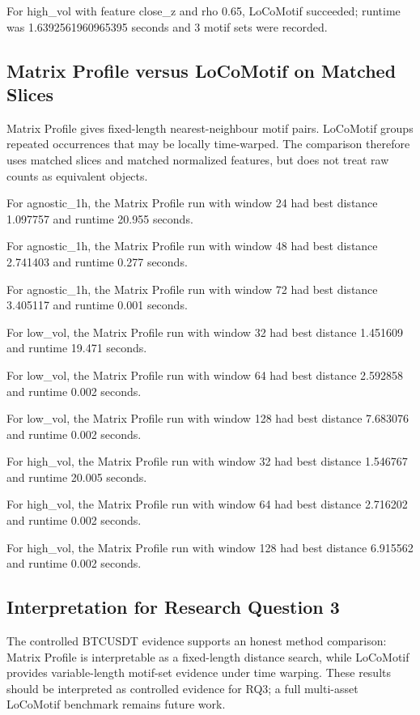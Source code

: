For high\_vol with feature close\_z and rho 0.65, LoCoMotif succeeded; runtime was 1.6392561960965395 seconds and 3 motif sets were recorded.

\subsection{Matrix Profile versus LoCoMotif on Matched Slices}

Matrix Profile gives fixed-length nearest-neighbour motif pairs. LoCoMotif groups repeated occurrences that may be locally time-warped. The comparison therefore uses matched slices and matched normalized features, but does not treat raw counts as equivalent objects.

For agnostic\_1h, the Matrix Profile run with window 24 had best distance 1.097757 and runtime 20.955 seconds.

For agnostic\_1h, the Matrix Profile run with window 48 had best distance 2.741403 and runtime 0.277 seconds.

For agnostic\_1h, the Matrix Profile run with window 72 had best distance 3.405117 and runtime 0.001 seconds.

For low\_vol, the Matrix Profile run with window 32 had best distance 1.451609 and runtime 19.471 seconds.

For low\_vol, the Matrix Profile run with window 64 had best distance 2.592858 and runtime 0.002 seconds.

For low\_vol, the Matrix Profile run with window 128 had best distance 7.683076 and runtime 0.002 seconds.

For high\_vol, the Matrix Profile run with window 32 had best distance 1.546767 and runtime 20.005 seconds.

For high\_vol, the Matrix Profile run with window 64 had best distance 2.716202 and runtime 0.002 seconds.

For high\_vol, the Matrix Profile run with window 128 had best distance 6.915562 and runtime 0.002 seconds.

\subsection{Interpretation for Research Question 3}

The controlled BTCUSDT evidence supports an honest method comparison: Matrix Profile is interpretable as a fixed-length distance search, while LoCoMotif provides variable-length motif-set evidence under time warping. These results should be interpreted as controlled evidence for RQ3; a full multi-asset LoCoMotif benchmark remains future work.